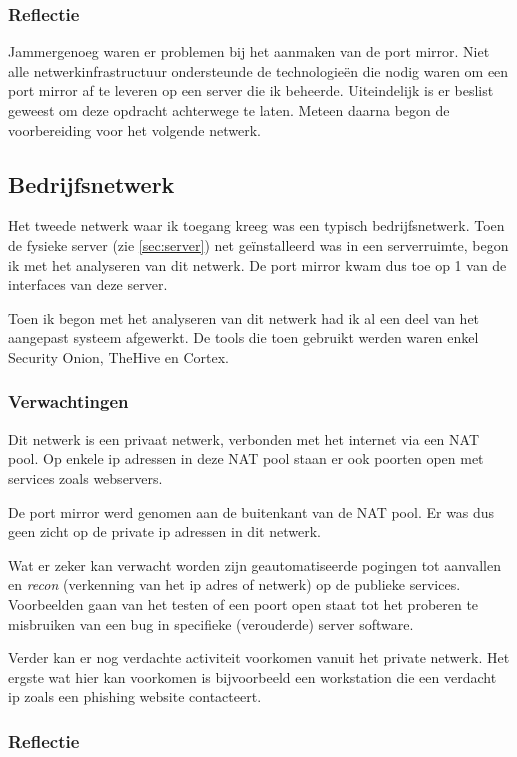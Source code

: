 \documentclass[a4paper, 12pt]{report}
\begin{document}
\subsubsection{Reflectie}
Jammergenoeg waren er problemen bij het aanmaken van de port mirror.
Niet alle netwerkinfrastructuur ondersteunde de technologieën die nodig waren om een port mirror af te leveren op een server die ik beheerde.
Uiteindelijk is er beslist geweest om deze opdracht achterwege te laten.
Meteen daarna begon de voorbereiding voor het volgende netwerk.

\subsection{Bedrijfsnetwerk}
\label{sec:bedrijfsnetwerk}
Het tweede netwerk waar ik toegang kreeg was een typisch bedrijfsnetwerk.
Toen de fysieke server (zie \ref{sec:server}) net geïnstalleerd was in een serverruimte, begon ik met het analyseren van dit netwerk.
De port mirror kwam dus toe op 1 van de interfaces van deze server.

Toen ik begon met het analyseren van dit netwerk had ik al een deel van het aangepast systeem afgewerkt.
De tools die toen gebruikt werden waren enkel Security Onion, TheHive en Cortex.

\subsubsection{Verwachtingen}
Dit netwerk is een privaat netwerk, verbonden met het internet via een NAT pool.
Op enkele ip adressen in deze NAT pool staan er ook poorten open met services zoals webservers.

De port mirror werd genomen aan de buitenkant van de NAT pool.
Er was dus geen zicht op de private ip adressen in dit netwerk.

Wat er zeker kan verwacht worden zijn geautomatiseerde pogingen tot aanvallen en \emph{recon} (verkenning van het ip adres of netwerk) op de publieke services.
Voorbeelden gaan van het testen of een poort open staat tot het proberen te misbruiken van een bug in specifieke (verouderde) server software.

Verder kan er nog verdachte activiteit voorkomen vanuit het private netwerk.
Het ergste wat hier kan voorkomen is bijvoorbeeld een workstation die een verdacht ip zoals een phishing website contacteert.


\subsubsection{Reflectie}
\end{document}
